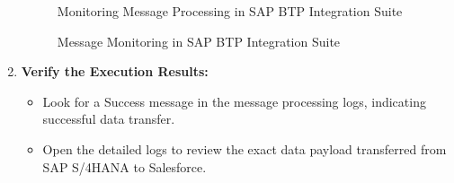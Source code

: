 \begin{enumerate}
        
    \begin{figure}[H]
    \centering
    \caption{Monitoring Message Processing in SAP BTP Integration Suite}
    
    \end{figure}

    \begin{figure}[H]
    \centering
    \caption{Message Monitoring in SAP BTP Integration Suite}
    
    \end{figure}
    
    \item \textbf{Verify the Execution Results:}
    \begin{itemize}
        \item Look for a Success message in the message processing logs, indicating successful data transfer.
        \item Open the detailed logs to review the exact data payload transferred from SAP S/4HANA to Salesforce.
    \end{itemize}
\end{enumerate}

